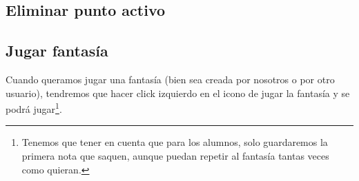 \documentclass{book}
\begin{document}
\subsection{Eliminar punto activo}

\subsection{Jugar fantasía}
Cuando queramos jugar una fantasía (bien sea creada por nosotros o por otro usuario), tendremos que hacer click izquierdo en el icono de jugar la fantasía y se podrá jugar\footnote{Tenemos que tener en cuenta que para los alumnos, solo guardaremos la primera nota que saquen, aunque puedan repetir al fantasía tantas veces como quieran.}.



	
\end{document}
